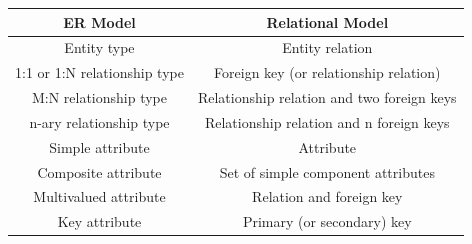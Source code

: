 \begin{table}[H]
    \centering
    \begin{tabular}{|c|c|}
    \hline
         \textbf{ER Model} & \textbf{Relational Model} \\
         \hline 
         Entity type & Entity relation \\
                  \hline 
         1:1 or 1:N relationship type & Foreign key (or relationship relation) \\
                  \hline 
         M:N relationship type & Relationship relation and two foreign keys \\
                  \hline 
         n-ary relationship type & Relationship relation and n foreign keys \\
                  \hline 
         Simple attribute & Attribute \\
                  \hline 
         Composite attribute & Set of simple component attributes \\
                  \hline 
         Multivalued attribute & Relation and foreign key \\
                  \hline 
         Key attribute & Primary (or secondary) key \\
                  \hline 
    \end{tabular}
\end{table}